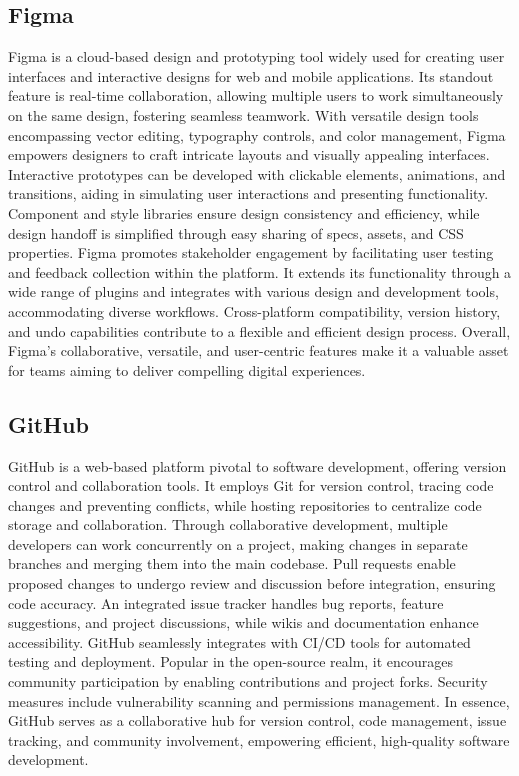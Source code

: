 \subsection{Figma}
Figma is a cloud-based design and prototyping tool widely used for creating user interfaces and interactive designs for web and mobile applications. Its standout feature is real-time collaboration, allowing multiple users to work simultaneously on the same design, fostering seamless teamwork. With versatile design tools encompassing vector editing, typography controls, and color management, Figma empowers designers to craft intricate layouts and visually appealing interfaces. Interactive prototypes can be developed with clickable elements, animations, and transitions, aiding in simulating user interactions and presenting functionality. Component and style libraries ensure design consistency and efficiency, while design handoff is simplified through easy sharing of specs, assets, and CSS properties. Figma promotes stakeholder engagement by facilitating user testing and feedback collection within the platform. It extends its functionality through a wide range of plugins and integrates with various design and development tools, accommodating diverse workflows. Cross-platform compatibility, version history, and undo capabilities contribute to a flexible and efficient design process. Overall, Figma's collaborative, versatile, and user-centric features make it a valuable asset for teams aiming to deliver compelling digital experiences.
\subsection{GitHub}
GitHub is a web-based platform pivotal to software development, offering version control and collaboration tools. It employs Git for version control, tracing code changes and preventing conflicts, while hosting repositories to centralize code storage and collaboration. Through collaborative development, multiple developers can work concurrently on a project, making changes in separate branches and merging them into the main codebase. Pull requests enable proposed changes to undergo review and discussion before integration, ensuring code accuracy. An integrated issue tracker handles bug reports, feature suggestions, and project discussions, while wikis and documentation enhance accessibility. GitHub seamlessly integrates with CI/CD tools for automated testing and deployment. Popular in the open-source realm, it encourages community participation by enabling contributions and project forks. Security measures include vulnerability scanning and permissions management. In essence, GitHub serves as a collaborative hub for version control, code management, issue tracking, and community involvement, empowering efficient, high-quality software development.
